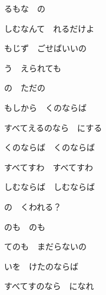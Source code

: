 るもな　の

しむなんて　れるだけよ

もじず　ごせばいいの

う　えられても

の　ただの

もしから　くのならば

すべてえるのなら　にする

くのならば　くのならば

すべてすわ　すべてすわ

しむならば　しむならば

の　くわれる？

のも　のも

てのも　まだらないの

いを　けたのならば

すべてすのなら　になれ
